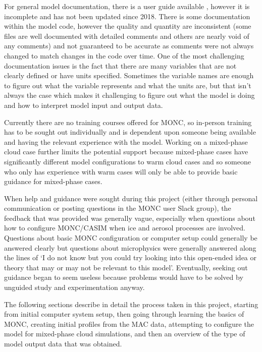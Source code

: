 For general model documentation, there is a user guide available \citep{moncDoc}, however it is incomplete and has not been updated since 2018. There is some documentation within the model code, however the quality and quantity are inconsistent (some files are well documented with detailed comments and others are nearly void of any comments) and not guaranteed to be accurate as comments were not always changed to match changes in the code over time. One of the most challenging documentation issues is the fact that there are many variables that are not clearly defined or have units specified. Sometimes the variable names are enough to figure out what the variable represents and what the units are, but that isn't always the case which makes it challenging to figure out what the model is doing and how to interpret model input and output data.

Currently there are no training courses offered for MONC, so in-person training has to be sought out individually and is dependent upon someone being available and having the relevant experience with the model. Working on a mixed-phase cloud case further limits the potential support because mixed-phase cases have significantly different model configurations to warm cloud cases and so someone who only has experience with warm cases will only be able to provide basic guidance for mixed-phase cases. 

When help and guidance were sought during this project (either through personal communication or posting questions in the MONC user Slack group), the feedback that was provided was generally vague, especially when questions about how to configure MONC/CASIM when ice and aerosol processes are involved. Questions about basic MONC configuration or computer setup could generally be answered clearly but questions about microphysics were generally answered along the lines of `I do not know but you could try looking into this open-ended idea or theory that may or may not be relevant to this model'. Eventually, seeking out guidance began to seem useless because problems would have to be solved by unguided study and experimentation anyway.

The following sections describe in detail the process taken in this project, starting from initial computer system setup, then going through learning the basics of MONC, creating initial profiles from the MAC data, attempting to configure the model for mixed-phase cloud simulations, and then an overview of the type of model output data that was obtained.

